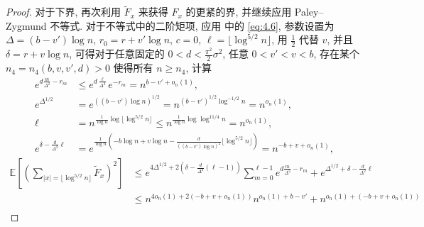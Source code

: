 \begin{proof}
{    }{
        对于下界, 再次利用 $\widetilde F_x$ 来获得 $F_x$ 的更紧的界, 并继续应用 Paley--Zygmund 不等式. 对于不等式中的二阶矩项, 应用 中的 \eqref{eq:4.6}, 参数设置为 $\Delta=(b-v')\log n$, $r_0=r+v'\log n$, $c=0$, $\ell=\lfloor\log^{5/2}n\rfloor$, 用 $\frac 12$ 代替 $v$, 并且 $\delta=r+v\log n$, 可得对于任意固定的 $0<d<\frac{\pi^2}2\sigma^2$, 任意 $0<v'<v<b$, 存在某个 $n_4=n_4(b,v,v',d)>0$ 使得所有 $n\ge n_4$, 计算
    }
    \begin{align*}
        e^{d\frac{m}{\Delta^2}-r_m}
        &
        \le
        e^{d\frac{\ell}{\Delta^2}}e^{-r_m}
        =
        n^{b-v'+o_n(1)},
        \\
        e^{\Delta^{1/2}}
        &
        =
        e^{
            ((b-v')\log n)^{1/2}
        }
        =
        n^{(b-v')^{1/2}\log^{-1/2}n}
        =
        n^{o_n(1)},
        \\
        \ell
        &
        =
        n^{\frac 1{\log n}\log\lfloor\log^{5/2}n\rfloor}
        \le
        n^{\frac 1{\log n}\log\log^{11/4}n}
        =
        n^{o_n(1)},
        \\
        e^{\delta-\frac{d}{\Delta^2}\ell}
        &
        =
        e^{
            \frac 1{\log n}\left(
                -b\log n+v\log n
                -\frac{d}{((b-v')\log n)^2}
                \lfloor\log^{5/2}n\rfloor
            \right)
        }
        =
        n^{-b+v+o_n(1)},
    \end{align*}
    \begin{align*}
        \mathbb E\!\left[
            \left(
                \sum_{
                    |x|=\lfloor\log^{5/2}n\rfloor
                }
                \!\!\!
                \widetilde F_x
            \right)^2
        \right]
        &
        \le
        e^{4\Delta^{1/2}+2(\delta-\frac{d}{\Delta^2}(\ell-1))}
        \sum_{m=0}^{\ell-1}
        e^{d\frac{m}{\Delta^2}-r_m}
        +
        e^{\Delta^{1/2}+\delta-\frac{d}{\Delta^2}\ell}
        \\ &
        \le
        n^{4o_n(1)+2(-b+v+o_n(1))}
        n^{o_n(1)+b-v'}
        +
        n^{o_n(1)+(-b+v+o_n(1))}
        \\ &

\end{align*}
\end{proof}
